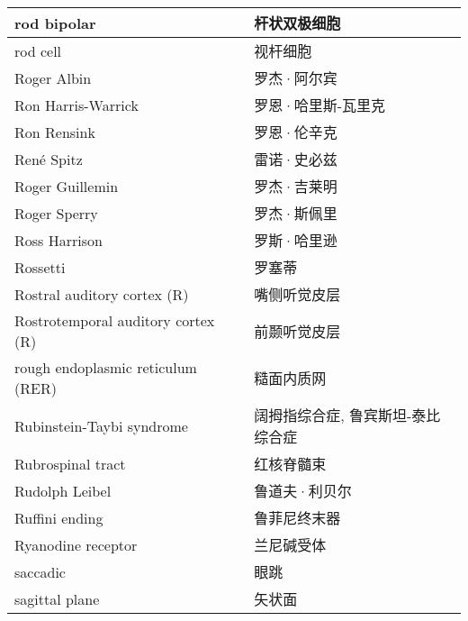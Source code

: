 \begin{longtable}{lll}
	\midrule
	rod bipolar   && 杆状双极细胞  \\
	
	\midrule
	rod cell   && 视杆细胞  \\
	
	\midrule
	Roger Albin   && 罗杰·阿尔宾  \\
	
	\midrule
	Ron Harris-Warrick   && 罗恩·哈里斯-瓦里克  \\
	
	\midrule
	Ron Rensink   && 罗恩·伦辛克  \\
	
	\midrule
	René Spitz   && 雷诺·史必兹  \\
	
	\midrule
	Roger Guillemin   && 罗杰·吉莱明  \\
	
	\midrule
	Roger Sperry   && 罗杰·斯佩里  \\
	
	\midrule
	Ross Harrison   && 罗斯·哈里逊  \\
	
	\midrule
	Rossetti   && 罗塞蒂  \\
	
	\midrule
	Rostral auditory cortex (R)   && 嘴侧听觉皮层  \\
	
	\midrule
	Rostrotemporal auditory cortex (R)   && 前颞听觉皮层 \\
	
	\midrule
	rough endoplasmic reticulum (RER)   && 糙面内质网 \\
	
	\midrule
	Rubinstein-Taybi syndrome  && 阔拇指综合症, 鲁宾斯坦-泰比综合症 \\
	
	\midrule
	Rubrospinal tract   && 红核脊髓束 \\
	
	\midrule
	Rudolph Leibel   && 鲁道夫·利贝尔 \\
	
	\midrule
	Ruffini ending   && 鲁菲尼终末器 \\
	
	\midrule
	Ryanodine receptor   && 兰尼碱受体 \\
	
	\midrule
	saccadic   && 眼跳 \\
	
	\midrule
	sagittal plane   && 矢状面 \\
	

\end{longtable}
